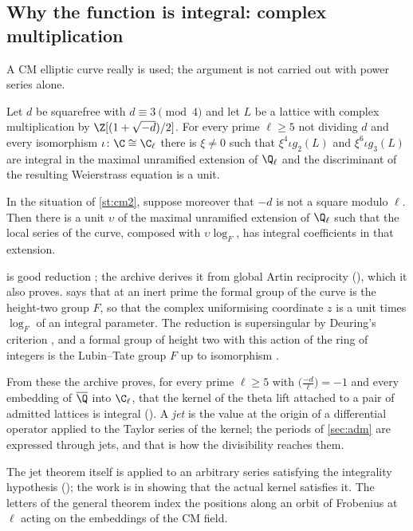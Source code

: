 \subsection{Why the function is integral: complex multiplication}
A CM elliptic curve really is used; the argument is not carried out with power series alone.
\begin{statement}[\lean{CM2}]\label{st:cm2}
Let $d$ be squarefree with $d\equiv3\pmod4$ and let $L$ be a lattice with complex
multiplication by $\Z[(1+\sqrt{-d})/2]$. For every prime $\ell\ge5$ not dividing $d$ and every
isomorphism $\iota\colon\C\cong\C_\ell$ there is $\xi\ne0$ such that
$\xi^4\iota g_2(L)$ and $\xi^6\iota g_3(L)$ are integral in the maximal unramified
extension of $\Q_\ell$ and the discriminant of the resulting Weierstrass equation is a unit.
\end{statement}
\begin{statement}[\lean{CM3}]\label{st:cm3}
In the situation of \cref{st:cm2}, suppose moreover that $-d$ is not a square modulo $\ell$.
Then there is a unit $\upsilon$ of the maximal unramified extension of $\Q_\ell$ such that the
local series of the curve, composed with $\upsilon\log_F$, has integral coefficients in that
extension.
\end{statement}
 is good reduction \cite{serretate1968}; the archive derives it from global Artin
reciprocity \lvS{} (), which it also proves.
 says that at an inert prime the formal group of the curve is the height-two group
$F$, so that the complex uniformising coordinate $z$ is a unit times $\log_F$ of an integral
parameter. The reduction is supersingular by Deuring's criterion \cite{deuring1941}, and a
formal group of height two with this action of the ring of integers is the Lubin--Tate group
$F$ up to isomorphism \cite{lubintate1965,honda1970}.

From these the archive proves, for every prime $\ell\ge5$ with $\bigl(\tfrac{-d}{\ell}\bigr)=-1$ and
every embedding of $\overline\Q$ into $\C_\ell$, that the kernel of the theta lift attached to a
pair of admitted lattices is integral \lvS{} (). A \emph{jet} is the value at
the origin of a differential operator applied to the Taylor series of the kernel; the periods
of \cref{sec:adm} are expressed through jets, and that is how the divisibility reaches them.

The jet theorem itself is applied to an arbitrary series satisfying the integrality hypothesis
\lvP{} (); the work is in showing that the actual kernel
satisfies it. The letters of the general theorem index the positions along an orbit of
Frobenius at $\ell$ acting on the embeddings of the CM field.

